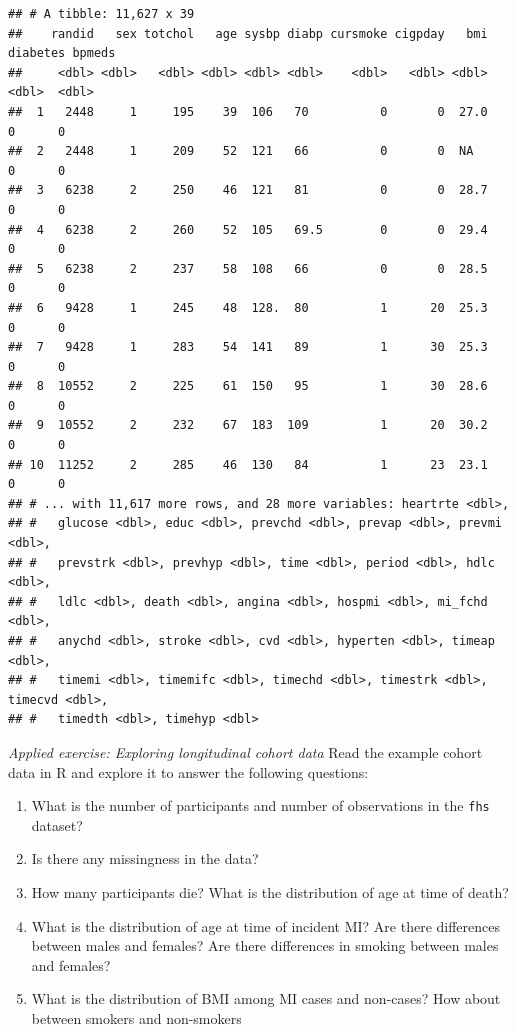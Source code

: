 \documentclass[
]{book}
\providecommand{\tightlist}{%
  \setlength{\itemsep}{0pt}\setlength{\parskip}{0pt}}
\begin{document}
\begin{verbatim}
## # A tibble: 11,627 x 39
##    randid   sex totchol   age sysbp diabp cursmoke cigpday   bmi diabetes bpmeds
##     <dbl> <dbl>   <dbl> <dbl> <dbl> <dbl>    <dbl>   <dbl> <dbl>    <dbl>  <dbl>
##  1   2448     1     195    39  106   70          0       0  27.0        0      0
##  2   2448     1     209    52  121   66          0       0  NA          0      0
##  3   6238     2     250    46  121   81          0       0  28.7        0      0
##  4   6238     2     260    52  105   69.5        0       0  29.4        0      0
##  5   6238     2     237    58  108   66          0       0  28.5        0      0
##  6   9428     1     245    48  128.  80          1      20  25.3        0      0
##  7   9428     1     283    54  141   89          1      30  25.3        0      0
##  8  10552     2     225    61  150   95          1      30  28.6        0      0
##  9  10552     2     232    67  183  109          1      20  30.2        0      0
## 10  11252     2     285    46  130   84          1      23  23.1        0      0
## # ... with 11,617 more rows, and 28 more variables: heartrte <dbl>,
## #   glucose <dbl>, educ <dbl>, prevchd <dbl>, prevap <dbl>, prevmi <dbl>,
## #   prevstrk <dbl>, prevhyp <dbl>, time <dbl>, period <dbl>, hdlc <dbl>,
## #   ldlc <dbl>, death <dbl>, angina <dbl>, hospmi <dbl>, mi_fchd <dbl>,
## #   anychd <dbl>, stroke <dbl>, cvd <dbl>, hyperten <dbl>, timeap <dbl>,
## #   timemi <dbl>, timemifc <dbl>, timechd <dbl>, timestrk <dbl>, timecvd <dbl>,
## #   timedth <dbl>, timehyp <dbl>
\end{verbatim}

\emph{Applied exercise: Exploring longitudinal cohort data}
Read the example cohort data in R and explore it to answer the following
questions:

\begin{enumerate}
\def\labelenumi{\arabic{enumi}.}
\tightlist
\item
  What is the number of participants and number of observations in the \texttt{fhs} dataset?
\item
  Is there any missingness in the data?
\item
  How many participants die? What is the distribution of age at time of death?
\item
  What is the distribution of age at time of incident MI? Are there differences between males and females? Are there differences in smoking between males and females?
\item
  What is the distribution of BMI among MI cases and non-cases? How about between smokers and non-smokers
\end{enumerate}
\end{document}
